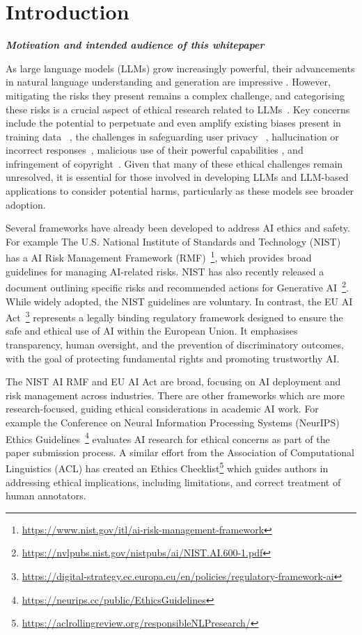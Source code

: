 \section{Introduction}
\noindent\textbf{\textit{Motivation and intended audience of this whitepaper}}
\newline


As large language models (LLMs) grow increasingly powerful, their advancements in natural language understanding and generation are impressive \citep{min_recent_2023}. However, mitigating the risks they present remains a complex challenge, and categorising these risks is a crucial aspect of ethical research related to LLMs~\cite{weidinger2022taxonomy}. Key concerns include the potential to perpetuate and even amplify existing biases present in training data ~\citep{gallegos2024bias}, the challenges in safeguarding user privacy ~\citep{yao2024survey}, hallucination or incorrect responses~\citep{abercrombie-etal-2023-mirages, xu2024hallucination}, malicious use of their powerful capabilities \citep{cuthbertson_chatgpt_2023}, and infringement of copyright~\citep{Lucchi_2023}. Given that many of these ethical challenges remain unresolved, it is essential for those involved in developing LLMs and LLM-based applications to consider potential harms, particularly as these models see broader adoption.

Several frameworks have already been developed to address AI ethics and safety. For example The U.S. National Institute of Standards and Technology (NIST) has a AI Risk Management Framework (RMF)~\footnote{\url{https://www.nist.gov/itl/ai-risk-management-framework}}, which provides broad guidelines for managing AI-related risks. NIST has also recently released a document outlining specific risks and recommended actions for Generative AI~\footnote{\url{https://nvlpubs.nist.gov/nistpubs/ai/NIST.AI.600-1.pdf}}. While widely adopted, the NIST guidelines are voluntary. In contrast, the EU AI Act~\footnote{\url{https://digital-strategy.ec.europa.eu/en/policies/regulatory-framework-ai}} represents a legally binding regulatory framework designed to ensure the safe and ethical use of AI within the European Union. It emphasises transparency, human oversight, and the prevention of discriminatory outcomes, with the goal of protecting fundamental rights and promoting trustworthy AI.  

The NIST AI RMF and EU AI Act are broad, focusing on AI deployment and risk management across industries. There are other frameworks which are more research-focused, guiding ethical considerations in academic AI work. For example the Conference on Neural Information Processing Systems (NeurIPS) Ethics Guidelines~\footnote{\url{https://neurips.cc/public/EthicsGuidelines}} evaluates AI research for ethical concerns as part of the paper submission process.
A similar effort from the Association of Computational Linguistics (ACL) has created an Ethics Checklist\footnote{\url{https://aclrollingreview.org/responsibleNLPresearch/}} which guides authors in addressing ethical implications, including limitations, and correct treatment of human annotators.

